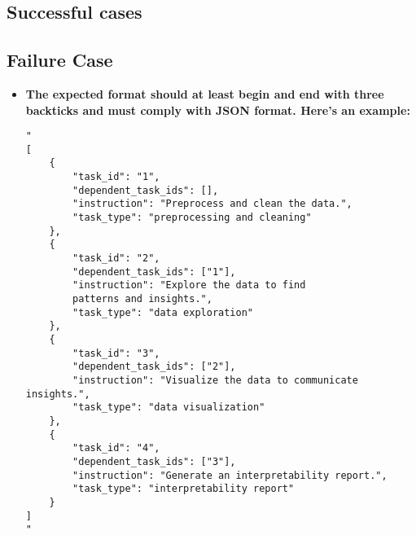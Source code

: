 \subsection{Successful cases}











\subsection{Failure Case}
\label{appendix: worse_example}












\begin{itemize}
\item \textbf{The expected format should at least begin and end with three backticks and must comply with JSON format. Here's an example:}


\begin{tcolorbox}[colback=blue!5!white, colframe=blue!75!black, title=Expected JSON format:, text width=\textwidth]
\begin{verbatim}
"
[
    {
        "task_id": "1",
        "dependent_task_ids": [],
        "instruction": "Preprocess and clean the data.",
        "task_type": "preprocessing and cleaning"
    },
    {
        "task_id": "2",
        "dependent_task_ids": ["1"],
        "instruction": "Explore the data to find 
        patterns and insights.",
        "task_type": "data exploration"
    },
    {
        "task_id": "3",
        "dependent_task_ids": ["2"],
        "instruction": "Visualize the data to communicate insights.",
        "task_type": "data visualization"
    },
    {
        "task_id": "4",
        "dependent_task_ids": ["3"],
        "instruction": "Generate an interpretability report.",
        "task_type": "interpretability report"
    }
]
"
\end{verbatim}
\end{tcolorbox}

\end{itemize}